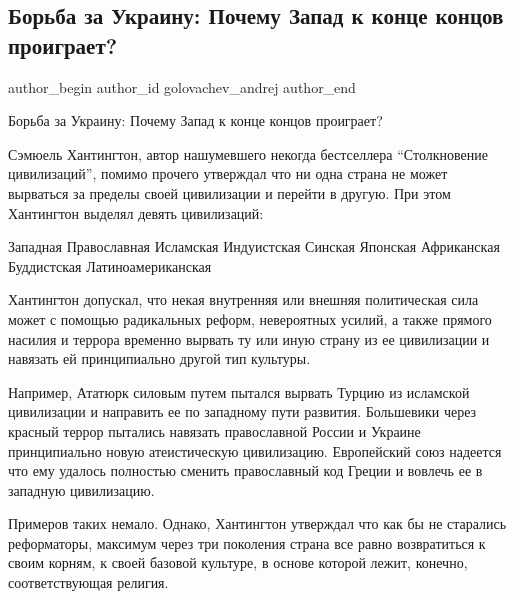  
 
 
 
 
 
\subsection{Борьба за Украину: Почему Запад к конце концов проиграет?}
\label{sec:26_01_2022.fb.golovachev_andrej.2.zapad_proigraet}
 
\ifcmt
 author_begin
   author_id golovachev_andrej
 author_end
\fi

Борьба за Украину: Почему Запад к конце концов проиграет?

Сэмюель Хантингтон, автор нашумевшего некогда бестселлера \enquote{Столкновение
цивилизаций}, помимо прочего утверждал что ни одна страна не может вырваться
за пределы своей цивилизации и перейти в другую. При этом Хантингтон выделял
девять цивилизаций:

\obeycr
Западная
Православная
Исламская
Индуистская
Синская
Японская
Африканская
Буддистская
Латиноамериканская
\restorecr

Хантингтон допускал, что некая внутренняя или внешняя политическая сила может
с помощью радикальных реформ, невероятных усилий, а также прямого насилия и
террора временно вырвать ту или иную страну из ее цивилизации и навязать ей
принципиально другой тип культуры.

Например, Ататюрк силовым путем пытался вырвать Турцию из исламской цивилизации
и направить ее по западному пути развития. Большевики через красный террор
пытались навязать православной России и Украине принципиально новую
атеистическую цивилизацию. Европейский союз надеется что ему удалось полностью
сменить православный код Греции и вовлечь ее в западную цивилизацию. 

Примеров таких немало.   Однако, Хантингтон утверждал что как бы не старались
реформаторы, максимум через три поколения страна все равно возвратиться к своим
корням, к своей базовой  культуре, в основе которой лежит, конечно,
соответствующая религия.   

